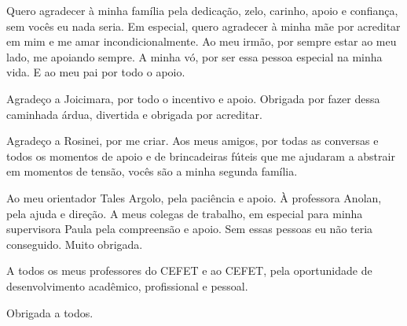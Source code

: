 %
%

\begin{agradecimentos}

Quero agradecer à minha família pela dedicação, zelo, carinho, apoio e confiança, sem vocês eu nada seria. Em especial, quero agradecer à minha mãe por acreditar em mim e me amar incondicionalmente. Ao meu irmão, por sempre estar ao meu lado, me apoiando sempre. A minha vó, por ser essa pessoa especial na minha vida. E ao meu pai por todo o apoio.

Agradeço a Joicimara, por todo o incentivo e apoio. Obrigada por fazer dessa caminhada árdua, divertida e obrigada por acreditar.

Agradeço a Rosinei, por me criar. Aos meus amigos, por todas as conversas e todos os momentos de apoio e de brincadeiras fúteis que me ajudaram a abstrair em momentos de tensão, vocês são a minha segunda família. 

Ao meu orientador Tales Argolo, pela paciência e apoio. À professora Anolan, pela ajuda e direção. A meus colegas de trabalho, em especial para minha supervisora Paula pela compreensão e apoio. Sem essas pessoas eu não teria conseguido. Muito obrigada.

A todos os meus professores do CEFET e ao CEFET, pela oportunidade de desenvolvimento acadêmico, profissional e pessoal.

Obrigada a todos.   
\end{agradecimentos}
